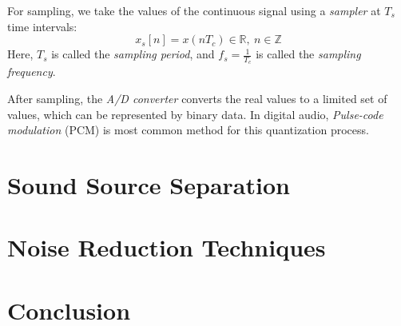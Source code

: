 \documentclass[11pt,a4paper]{report}
\begin{document}
For sampling, we take the values of the continuous signal using a \textit{sampler} at $T_s$ time intervals: \[ x_s[n] = x(n T_c) \in \mathbb{R},~ n \in \mathbb{Z} \] Here, $T_s$ is called the \textit{sampling period}, and $ f_s = \frac{1}{T_c} $ is called the \textit{sampling frequency}.

After sampling, the \textit{A/D converter} converts the real values to a limited set of values, which can be represented by binary data. In digital audio, \textit{Pulse-code modulation} (PCM) is most common method for this quantization process. 




\chapter{Sound Source Separation}


\chapter{Noise Reduction Techniques}

\chapter{Conclusion}




 
\end{document}
